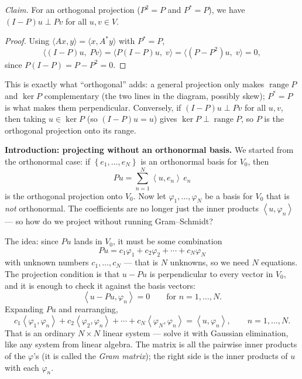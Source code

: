 \documentclass[11pt]{article}
\newcommand{\1}{\mathbf{1}}
\newcommand{\ip}[2]{\left\langle#1,#2\right\rangle}
\newcommand{\set}[1]{\left\{#1\right\}}
\DeclareMathOperator{\range}{range}
\theoremstyle{notestyle}
\theoremstyle{definition}
\begin{document}
\noindent\textit{Claim.} For an orthogonal projection ($P^2 = P$ and $P^* = P$), we have
$(I - P)u \perp Pv$ for all $u, v \in V$.
\begin{proof}
    Using $\langle Ax, y\rangle = \langle x, A^{*}y\rangle$ with $P^{*} = P$,
    $$\langle (I-P)u,\; Pv\rangle = \langle P(I-P)u,\; v\rangle = \langle (P - P^2)u,\; v\rangle = 0,$$
    since $P(I - P) = P - P^2 = 0$.
\end{proof}
\par This is exactly what ``orthogonal'' adds: a general projection only makes
$\range P$ and $\ker P$ complementary (the two lines in the diagram, possibly
skew); $P^* = P$ is what makes them perpendicular. Conversely, if $(I-P)u \perp Pv$ for
all $u, v$, then taking $u \in \ker P$ (so $(I-P)u = u$) gives $\ker P \perp
\range P$, so $P$ is the orthogonal projection onto its range.

\par \textbf{Introduction: projecting without an orthonormal basis.}
We started from the orthonormal case: if $\set{e_1, \dots, e_N}$ is an orthonormal basis
for $V_0$, then
$$Pu = \sum_{n=1}^{N} \ip{u}{e_n}\, e_n$$
is the orthogonal projection onto $V_0$.
Now let $\varphi_1, \dots, \varphi_N$ be a basis for $V_0$ that is \emph{not}
orthonormal. The coefficients are no longer just the inner products $\ip{u}{\varphi_n}$
--- so how do we project without running Gram--Schmidt?
\par The idea: since $Pu$ lands in $V_0$, it must be some combination
$$Pu = c_1 \varphi_1 + c_2 \varphi_2 + \cdots + c_N \varphi_N$$
with unknown numbers $c_1, \dots, c_N$ --- that is $N$ unknowns, so we need $N$
equations. The projection condition is that $u - Pu$ is perpendicular to every vector in
$V_0$, and it is enough to check it against the basis vectors:
$$\ip{u - Pu}{\varphi_n} = 0 \qquad \text{for } n = 1, \dots, N.$$
Expanding $Pu$ and rearranging,
$$c_1 \ip{\varphi_1}{\varphi_n} + c_2 \ip{\varphi_2}{\varphi_n} + \cdots +
c_N \ip{\varphi_N}{\varphi_n} = \ip{u}{\varphi_n},
\qquad n = 1, \dots, N.$$
That is an ordinary $N \times N$ linear system --- solve it with Gaussian elimination,
like any system from linear algebra. The matrix is all the pairwise inner products of
the $\varphi$'s (it is called the \textit{Gram matrix}); the right side is the inner
products of $u$ with each $\varphi_n$.
\end{document}
